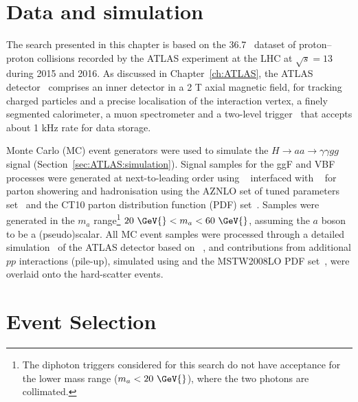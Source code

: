 \clearpage
\section{Data and simulation}
The search presented in this chapter is based on the 36.7~\ifb{} dataset of proton--proton collisions
recorded by the ATLAS experiment at the LHC at $\sqrt{s}=13$ \TeV{} during 2015 and 2016.
As discussed in Chapter~\ref{ch:ATLAS}, the ATLAS detector~\cite{PERF-2007-01} comprises an inner detector in a 2 T axial magnetic field, 
for tracking charged particles and a precise localisation of the interaction vertex, 
a finely segmented calorimeter, a muon spectrometer and a two-level trigger~\cite{TRIG-2016-01} that
accepts about 1 kHz rate for data storage.

Monte Carlo (MC) event generators were used to simulate the $H\to aa \to \gamma\gamma gg$ signal (Section~\ref{sec:ATLAS:simulation}).
Signal samples for the ggF and VBF processes were generated at next-to-leading order using 
\POWHEGBOX{}~\cite{Nason:2004rx,Frixione:2007vw,Alioli:2010xd} interfaced with \PYTHIA{}~\cite{Sjostrand:2014zea} for parton showering and hadronisation using the AZNLO set of tuned parameters set~\cite{STDM-2012-23} and the CT10 parton distribution function (PDF) set~\cite{Lai:2010vv}.
Samples were generated in the $m_a$ range\footnote{The diphoton triggers considered for this
search do not have acceptance for the lower mass range ($m_a<20~\GeV{}$), where the two photons are collimated.} 
$20~\GeV{} < m_a < 60~\GeV{}$, assuming the $a$ boson to be a (pseudo)scalar.
All MC event samples were processed through a detailed simulation~\cite{SOFT-2010-01} of the ATLAS detector
based on \geantFour{}~\cite{Agostinelli:2002hh}, and contributions from additional $pp$ interactions (pile-up), simulated using
\PYTHIA{} and the MSTW2008LO PDF set~\cite{Martin:2009iq}, were overlaid onto the hard-scatter events.

\section{Event Selection}
